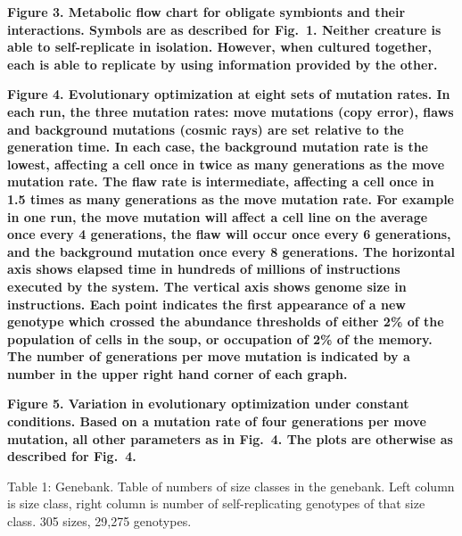 \newpage
\addtocounter{page}{1}

\bf Figure 3.  Metabolic flow chart for obligate symbionts and their
interactions. \rm  Symbols are as described for Fig.\ 1.  Neither creature is
able to self-replicate in isolation.  However, when cultured together, each
is able to replicate by using information provided by the other.

\newpage
\addtocounter{page}{1}

\bf Figure 4.  Evolutionary optimization at eight sets of mutation rates. \rm
In each run, the three mutation rates: move mutations (copy error), flaws
and background mutations (cosmic rays) are set relative to the generation
time.  In each case, the background mutation rate is the lowest, affecting
a cell once in twice as many generations as the move mutation rate.  The
flaw rate is intermediate, affecting a cell once in 1.5 times as many
generations as the move mutation rate.  For example in one run, the move
mutation will affect a cell line on the average once every 4 generations,
the flaw will occur once every 6 generations, and the background mutation
once every 8 generations.  The horizontal axis shows elapsed time in
hundreds of millions of instructions executed by the system.  The vertical
axis shows genome size in instructions.  Each point indicates the first
appearance of a new genotype which crossed the abundance thresholds of
either 2\% of the population of cells in the soup, or occupation of 2\% of
the memory.  The number of generations per move mutation is indicated by
a number in the upper right hand corner of each graph.

\newpage
\addtocounter{page}{3}

\bf Figure 5.  Variation in evolutionary optimization under constant
conditions. \rm  Based on a mutation rate of four generations per move
mutation, all other parameters as in Fig.\ 4.  The plots are otherwise
as described for Fig.\ 4.

\newpage
\addtocounter{page}{1}

Table 1:  Genebank.  Table of numbers of size classes in the genebank.  Left
column is size class, right column is number of self-replicating genotypes
of that size class.  305 sizes, 29,275 genotypes.
\eLP

